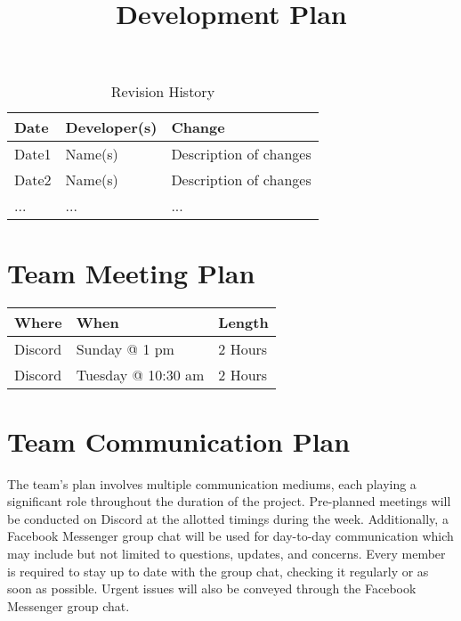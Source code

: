 \documentclass{article}
\title{Development Plan\\\progname}
\author{\authname}
\date{}
\begin{document}
\begin{table}[hp]
	\caption{Revision History} \label{TblRevisionHistory}
	\begin{tabularx}{\textwidth}{llX}
		\toprule
		\textbf{Date} & \textbf{Developer(s)} & \textbf{Change}\\
		\midrule
		Date1 & Name(s) & Description of changes\\
		Date2 & Name(s) & Description of changes\\
		... & ... & ...\\
		\bottomrule
	\end{tabularx}
\end{table}

\newpage

\maketitle


\section{Team Meeting Plan}
\begin{table}[hp]
\begin{tabularx}{\textwidth}{|l|l|X|}
\toprule
\textbf{Where} & \textbf{When} & \textbf{Length}\\
\midrule
Discord & Sunday @ 1 pm & 2 Hours\\
Discord & Tuesday @ 10:30 am & 2 Hours\\
\bottomrule
\end{tabularx}
\end{table}

\section{Team Communication Plan}
The team’s plan involves multiple communication mediums, each playing a significant role throughout the duration of the project. Pre-planned meetings will be conducted on Discord at the allotted timings during the week. Additionally, a Facebook Messenger group chat will be used for day-to-day communication which may include but not limited to questions, updates, and concerns. Every member is required to stay up to date with the group chat, checking it regularly or as soon as possible. Urgent issues will also be conveyed through the Facebook Messenger group chat. 
\end{document}
